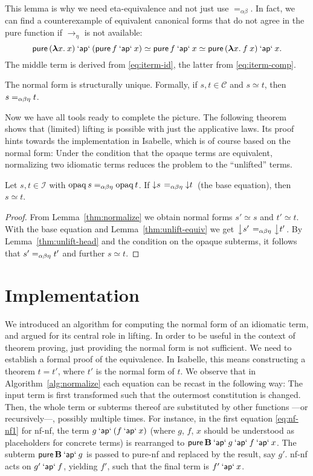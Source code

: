 This lemma is why we need eta-equivalence and not just use $=_{\alpha\beta}$.
In fact, we can find a counterexample of equivalent canonical forms that do
not agree in the pure function if $\to_\eta$ is not available:
\[ \operatorname{\mathsf{pure}}{({\boldsymbol\lambda} x.\>x)} \mathbin{\mathsf{`ap`}} (\operatorname{\mathsf{pure}} f \mathbin{\mathsf{`ap`}} x) \simeq
	\operatorname{\mathsf{pure}} f \mathbin{\mathsf{`ap`}} x \simeq \operatorname{\mathsf{pure}}{({\boldsymbol\lambda} x.\>f \> x)} \mathbin{\mathsf{`ap`}} x. \]
The middle term is derived from \eqref{eq:iterm-id}, the latter from
\eqref{eq:iterm-comp}.

\begin{corollary}\label{thm:nf-unique}
The normal form is structurally unique.
Formally, if $s,t \in \mathcal{C}$ and $s \simeq t$, then $s =_{\alpha\beta\eta} t$.
\end{corollary}

Now we have all tools ready to complete the picture.
The following theorem shows that (limited) lifting is possible with just
the applicative laws.
Its proof hints towards the implementation in Isabelle, which is of course
based on the normal form:
Under the condition that the opaque terms are equivalent, normalizing two
idiomatic terms reduces the problem to the ``unlifted'' terms.

\begin{theorem}\label{thm:nf-lifting}
Let $s,t \in \mathcal{I}$ with $\operatorname{opaq} s =_{\alpha\beta\eta} \operatorname{opaq} t$.
If $\left\downarrow s\right. =_{\alpha\beta\eta} \left\downarrow t\right.$ (the base equation), then $s \simeq t$.
\end{theorem}
\begin{proof}
From Lemma~\ref{thm:normalize} we obtain normal forms $s' \simeq s$ and
$t' \simeq t$.
With the base equation and Lemma~\ref{thm:unlift-equiv} we get
$\left\downarrow s'\right. =_{\alpha\beta\eta} \left\downarrow t'\right.$.
By Lemma~\ref{thm:unlift-head} and the condition on the opaque subterms, it
follows that $s' =_{\alpha\beta\eta} t'$ and further $s \simeq t$.
\end{proof}

\section{Implementation}\label{subsec:nf-implementation}

We introduced an algorithm for computing the normal form of an idiomatic term,
and argued for its central role in lifting.
In order to be useful in the context of theorem proving, just providing the
normal form is not sufficient.
We need to establish a formal proof of the equivalence.
In Isabelle, this means constructing a theorem $t = t'$, where $t'$ is the
normal form of $t$.
We observe that in Algorithm~\ref{alg:normalize} each equation can be recast
in the following way:
The input term is first transformed such that the outermost constitution is
changed.
Then, the whole term or subterms thereof are substituted by other functions%
---or recursively---, possibly multiple times.
For instance, in the first equation \eqref{eq:nf-nf1} for nf-nf, the term
$g \mathbin{\mathsf{`ap`}} (f \mathbin{\mathsf{`ap`}} x)$ (where $g$, $f$, $x$ should be understood as placeholders
for concrete terms) is rearranged to $\operatorname{\mathsf{pure}} \mathbf{B} \mathbin{\mathsf{`ap`}} g \mathbin{\mathsf{`ap`}} f \mathbin{\mathsf{`ap`}} x$.
The subterm $\operatorname{\mathsf{pure}} \mathbf{B} \mathbin{\mathsf{`ap`}} g$ is passed to pure-nf and replaced by
the result, say $g'$.
nf-nf acts on $g' \mathbin{\mathsf{`ap`}} f$, yielding $f'$, such that the final term is
$f' \mathbin{\mathsf{`ap`}} x$.

